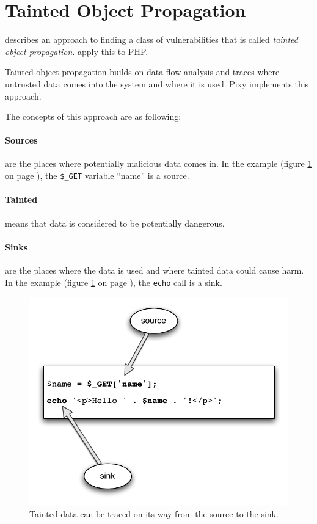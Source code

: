 \section{Tainted Object Propagation}
\label{tainting}
\cite{finding-security-vulnerabilities} describes an approach to finding a class of vulnerabilities that is called \emph{tainted object propagation}. \cite{pixy-short, pixy-long, pixy-dissertation} apply this to PHP.

Tainted object propagation builds on data-flow analysis and traces where untrusted data comes into the system and where it is used. Pixy implements this approach.

The concepts of this approach are as following:
\paragraph{Sources} are the places where potentially malicious data comes in. In the example (figure \ref{fig:taint} on page \pageref{fig:taint}), the \texttt{\$\_GET} variable ``name'' is a source.
\paragraph{Tainted} means that data is considered to be potentially dangerous.
\paragraph{Sinks} are the places where the data is used and where tainted data could cause harm. In the example (figure \ref{fig:taint} on page \pageref{fig:taint}), the \texttt{echo} call is a sink.

\begin{figure}[!h]
  \includegraphics[scale=0.8]{images/taint}
  \caption{Tainted data can be traced on its way from the source to the sink.}
  \label{fig:taint}
\end{figure}

